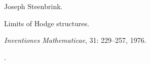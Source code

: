 Joseph Steenbrink.

\newblock Limits of Hodge structures.

\newblock \emph{Inventiones Mathematicae}, 31: 229--257, 1976.

\newblock {}.


